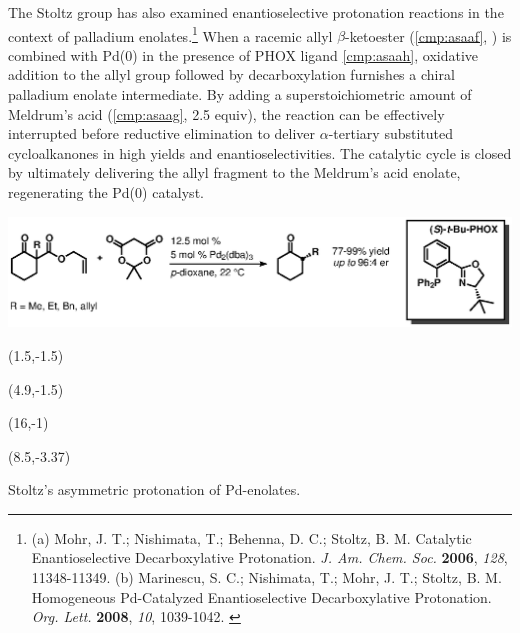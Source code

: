  The Stoltz group has also examined enantioselective protonation reactions in the context
 of palladium enolates.\footnote{(a) {\frenchspacing Mohr, J. T.; Nishimata, T.; Behenna, D.
 C.; Stoltz, B.
 M.
 Catalytic Enantioselective Decarboxylative Protonation. \textit{J. Am. Chem. Soc.} \textbf{2006},
 \textit{128}, 11348-11349.} (b) {\frenchspacing Marinescu, S. C.; Nishimata, T.; Mohr, J. T.;
 Stoltz, B. M.
 Homogeneous Pd-Catalyzed Enantioselective Decarboxylative Protonation. \textit{Org. Lett.}
 \textbf{2008}, \textit{10}, 1039-1042.} \label{ref:stoltzprotonation}} When a racemic allyl
 $\beta$-ketoester (\ref{cmp:asaaf}, ) is combined with Pd(0) in the presence of
 PHOX ligand \ref{cmp:asaah}, oxidative addition to the allyl group followed by decarboxylation
 furnishes a chiral palladium enolate intermediate. By adding a superstoichiometric amount of
 Meldrum's acid (\ref{cmp:asaag}, 2.5 equiv), the reaction can be effectively interrupted before
 reductive elimination to deliver $\alpha$-tertiary substituted cycloalkanones in high yields and enantioselectivities. The catalytic cycle is closed by ultimately delivering the allyl fragment to the Meldrum's acid enolate, regenerating the
 Pd(0) catalyst.
  \begin{Scheme}[h]
  \centering
  \includegraphics[scale=0.8]{chp_asymmetric/images/stoltzprotonation}
  \begin{textblock}{1}(1.5,-1.5)  \end{textblock}
  \begin{textblock}{1}(4.9,-1.5)  \end{textblock}
  \begin{textblock}{1}(16,-1)  \end{textblock}
  \begin{textblock}{1}(8.5,-3.37)  \end{textblock}
  \caption{Stoltz's asymmetric protonation of Pd-enolates.}
  \label{sch:asstoltzprotonation}
\end{Scheme}   
 
